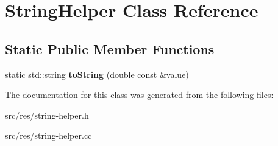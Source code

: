 \hypertarget{classStringHelper}{}\section{String\+Helper Class Reference}
\label{classStringHelper}
\subsection*{Static Public Member Functions}
\begin{DoxyCompactItemize}
\item 
static std\+::string {\bfseries to\+String} (double const \&value)\hypertarget{classStringHelper_a9b19e4812a60dcc1c3f2706db473bad7}{}\label{classStringHelper_a9b19e4812a60dcc1c3f2706db473bad7}

\end{DoxyCompactItemize}


The documentation for this class was generated from the following files\+:\begin{DoxyCompactItemize}
\item 
src/res/string-\/helper.\+h\item 
src/res/string-\/helper.\+cc\end{DoxyCompactItemize}
